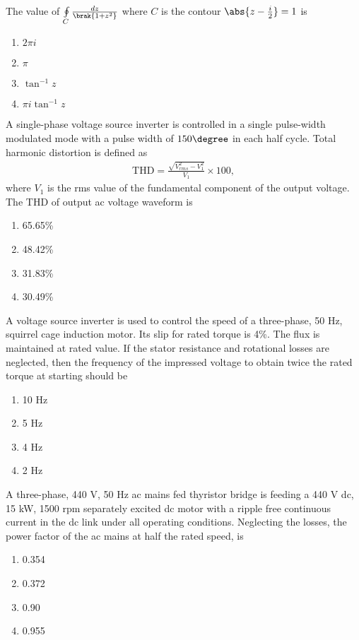 \item The value of $\oint\limits_{C}\frac{dz}{\brak{1 + z^2}}$ where $C$ is the contour $\abs{z - \frac{i}{2}} = 1$ is
\begin{enumerate}
    \item $2 \pi i$
    \item $\pi$
    \item $\tan^{-1}z$
    \item $\pi i \tan^{-1}z$ \\
\end{enumerate}
\item A single-phase voltage source inverter is controlled in a single pulse-width modulated mode with a pulse width of $150\degree$ in each half cycle. Total harmonic distortion is defined as 
\begin{align*}
    \text{THD} = \frac{\sqrt{V_{rms}^2 - V_1^2}}{V_1} \times 100, 
\end{align*}where $V_1$ is the rms value of the fundamental component of the output voltage. The THD of output ac voltage waveform is
\begin{enumerate}
    \item 65.65\%
    \item 48.42\%
    \item 31.83\%
    \item 30.49\% \\
\end{enumerate}
\item A voltage source inverter is used to control the speed of a three-phase, 50 Hz, squirrel cage induction motor. Its slip for rated torque is 4\%. The flux is maintained at rated value. If the stator resistance and rotational losses are neglected, then the frequency of the impressed voltage to obtain twice the rated torque at starting should be
 \begin{enumerate}
     \item 10 Hz
     \item 5 Hz
     \item 4 Hz
     \item 2 Hz \\
 \end{enumerate}
\item A three-phase, 440 V, 50 Hz ac mains fed thyristor bridge is feeding a 440 V dc, 15 kW, 1500 rpm separately excited dc motor with a ripple free continuous current in the dc link under all operating conditions. Neglecting the losses, the power factor of the ac mains at half the rated speed, is
\begin{enumerate}
     \item 0.354
     \item 0.372
     \item 0.90
     \item 0.955 \\
 \end{enumerate}
